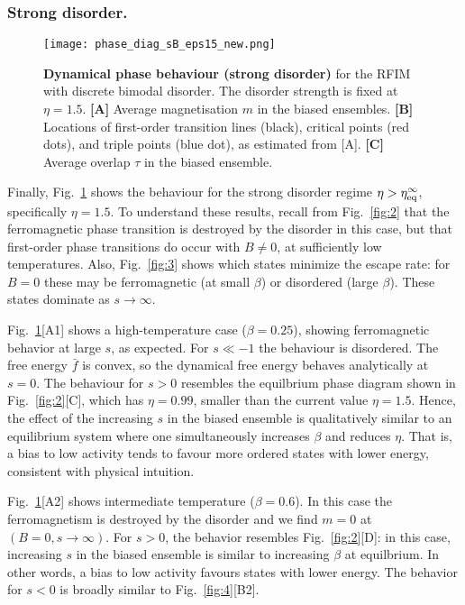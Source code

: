 \documentclass{iopart}
\begin{document}
\subsubsection{Strong disorder.}
\label{sec:strong_dis_activity}


\begin{figure}
  \centering
  \texttt{[image: phase\_diag\_sB\_eps15\_new.png]}
    \caption{\textbf{Dynamical phase behaviour (strong disorder)} for the RFIM with discrete bimodal disorder. The disorder strength is fixed at $\eta=1.5$. 
  \textbf{[A]} Average magnetisation $m$ in the biased ensembles. 
  \textbf{[B]} Locations of first-order transition lines (black), critical points (red dots), and triple points (blue dot), as estimated from [A]. 
  \textbf{[C]} Average overlap $\tau$ in the biased ensemble.}
  \label{fig:6}
\end{figure}


Finally, Fig.~\ref{fig:6} shows the behaviour for the strong disorder regime $\eta > \eta_{\rm eq}^{\infty}$, specifically $\eta=1.5$.  To understand these results,  recall from Fig.~\ref{fig:2} that the ferromagnetic phase transition is destroyed by the disorder in this case, but that first-order phase transitions do occur with $B\neq0$, at sufficiently low temperatures.  Also, Fig.~\ref{fig:3} shows which states minimize the escape rate: for $B=0$ these may be  ferromagnetic (at small $\beta$) or disordered (large $\beta$).  These states dominate as $s\to\infty$.

Fig.~\ref{fig:6}[A1] shows a high-temperature case ($\beta=0.25$), showing ferromagnetic behavior at large $s$, as expected.  For $s\ll-1$ the behaviour is disordered.  The free energy $\bar f$ is convex, so the dynamical free energy behaves analytically at $s=0$.  The behaviour for $s>0$ resembles the equilbrium phase diagram shown in Fig.~\ref{fig:2}[C], which has $\eta=0.99$, smaller than the current value $\eta=1.5$.  Hence, the effect of the increasing $s$ in the biased ensemble is qualitatively similar to an equilibrium system where one simultaneously increases $\beta$ and reduces $\eta$.  That is, a bias to low activity tends to favour more ordered states with lower energy, consistent with physical intuition.

Fig.~\ref{fig:6}[A2] shows intermediate temperature ($\beta=0.6$).  In this case the ferromagnetism is destroyed by the disorder and we find $m=0$ at $(B=0,s\to\infty)$.  For $s>0$, the behavior resembles Fig.~\ref{fig:2}[D]: in this case, increasing $s$ in the biased ensemble is similar to increasing $\beta$ at equilbrium.  In other words, a bias to low activity favours states with lower energy.  The behavior for $s<0$ is broadly similar to Fig.~\ref{fig:4}[B2].  
\end{document}
